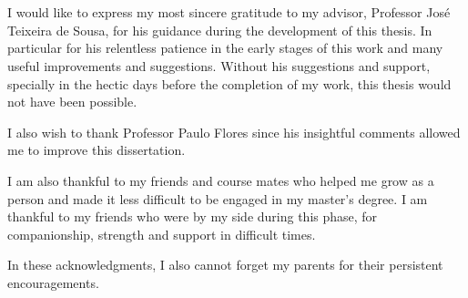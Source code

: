 
\section*{\acknowledgments}


I would like to express my most sincere gratitude to my advisor, Professor José
Teixeira de Sousa, for his guidance during the development of this thesis. In
particular for his relentless patience in the early stages of this work and many
useful improvements and suggestions.  Without his suggestions and support,
specially in the hectic days before the completion of my work, this thesis would
not have been possible.

I also wish to thank Professor Paulo Flores since his insightful comments
allowed me to improve this dissertation.

I am also thankful to my friends and course mates who helped me grow as a person
and made it less difficult to be engaged in my master's degree.  I am thankful
to my friends who were by my side during this phase, for companionship, strength
and support in difficult times.

In these acknowledgments, I also cannot forget my parents for their persistent
encouragements.

\cleardoublepage

